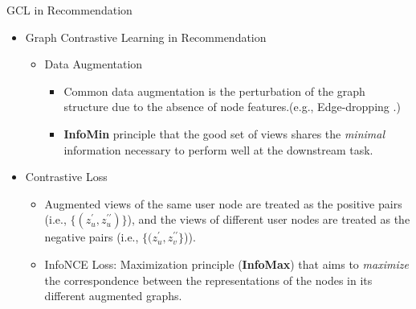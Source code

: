 \documentclass[t]{beamer}
\begin{document}
\begin{frame}[allowframebreaks]{GCL in Recommendation}
\setlistsep{1ex}{0ex}{0ex}
\begin{itemize}
    \item Graph Contrastive Learning in Recommendation
    \begin{itemize}
        \item Data Augmentation
        \begin{itemize}
            \item Common data augmentation is the perturbation of the graph structure due to the absence of node features.(e.g.,  Edge-dropping .)
            \item \textbf{InfoMin} principle that the good set of views shares the \textit{minimal} information necessary to perform well at the downstream task.
        \end{itemize}
    \end{itemize}



\framebreak

        
    \item Contrastive Loss
        \begin{itemize}
            \item Augmented views of the same user node are treated as the positive pairs (i.e., $\{(z_u^{\prime}, z_u^{\prime \prime})\}$), and the views of different user nodes are treated as the negative pairs (i.e., $\{(z_u^{\prime}, z_v^{\prime \prime}\}$)). 
            \item InfoNCE Loss: Maximization principle  (\textbf{InfoMax}) that aims to \textit{maximize} the correspondence between the representations of the nodes in its different augmented graphs.


\end{itemize}
\end{itemize}
\end{frame}
\end{document}
